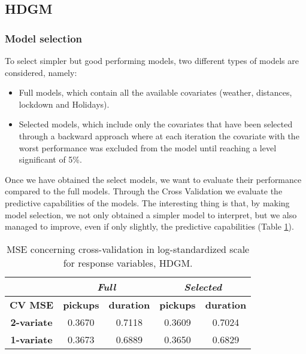 \subsection{HDGM}
\subsubsection{Model selection} To select simpler but good performing models, two different types of models are considered, namely:
\begin{itemize}
	\item Full models, which contain all the available covariates (weather, distances, lockdown and Holidays).
	\item Selected models, which include only the covariates that have been selected through a backward approach where at each iteration the covariate with the worst performance was excluded from the model until reaching a level significant of \num{5}\%.
\end{itemize}
Once we have obtained the select models, we want to evaluate their performance compared to the full models. Through the Cross Validation we evaluate the predictive capabilities of the models. The interesting thing is that, by making model selection, we not only obtained a simpler model to interpret, but we also managed to improve, even if only slightly, the predictive capabilities (Table \ref{Cross-validation mean squared errors HDGM}).
 
\begin{table}[h!]
	\centering
	\renewcommand\arraystretch{1.3}
	\begin{tabular}{c|cc|cc}
		\hline
		\multicolumn{1}{l|}{} & \multicolumn{2}{c|}{\textit{Full}} & \multicolumn{2}{c}{\textit{Selected} }\\ 
		\hline
		\textbf{CV MSE} & \multicolumn{1}{c|}{\textbf{pickups }} & \textbf{duration} & \multicolumn{1}{c|}{\textbf{pickups}} & \textbf{duration} \\ 
		\hline
		\textbf{2-variate } & \multicolumn{1}{c|}{0.3670}  & 0.7118   & \multicolumn{1}{c|}{0.3609}  & 0.7024   \\ 
		\hline
		\textbf{1-variate } & \multicolumn{1}{c|}{0.3673}  & 0.6889   & \multicolumn{1}{c|}{0.3650}  & 0.6829   \\ 
		\hline
	\end{tabular}
	\caption[MSE concerning cross-validation in log-standardized scale for response variables (HDGM)]{MSE concerning cross-validation in log-standardized scale for response variables, HDGM.}
	\label{Cross-validation mean squared errors HDGM}
\end{table}


